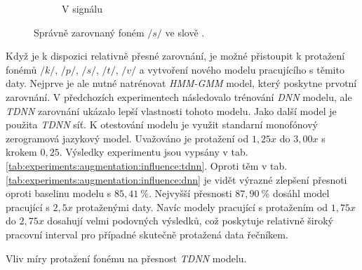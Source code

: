 \begin{figure}[htpb]
\begin{subfigure}[b]{0.55\textwidth}
    \caption{V signálu}
    \label{fig:experiments:augmentation:alignemnt:correct:audio}
  \end{subfigure}
  \caption{Správně zarovnaný foném $/s/$ ve slově .}
  \label{fig:experiments:augmentation:alignemnt:correct}
\end{figure}

Když je k dispozici relativně přesné zarovnání, je možné přistoupit k protažení fonémů $/k/$, $/p/$, $/s/$, $/t/$, $/v/$ a vytvoření nového modelu pracujícího s těmito daty. Nejprve je ale nutné natrénovat \textit{HMM-GMM} model, který poskytne prvotní zarovnání. V předchozích experimentech následovalo trénování \textit{DNN} modelu, ale \textit{TDNN} zarovnání ukázalo lepší vlastnosti tohoto modelu. Jako další model je použita \textit{TDNN} síť. K otestování modelu je využit standarní monofónový zerogramová jazykový model. Uvažováno je protažení od $1,25x$ do $3,00x$ s krokem $0,25$. Výsledky experimentu jsou vypsány v tab. \ref{tab:experiments:augmentation:influence:tdnn}. Oproti těm v tab. \ref{tab:experiments:augmentation:influence:dnn} je vidět výrazné zlepšení přesnoti  oproti baselinu modelu s $85,41\ \%$. Nejvyšší přesnosti $87,90\ \%$ dosáhl model pracující s $2,5x$ protaženými daty. Navíc modely pracující s protažením od $1,75x$ do $2,75x$ dosahují velmi podovných výsledků, což poskytuje relativně široký pracovní interval pro případné skutečně protažená data řečníkem.

\begin{table}[htpb]
  \centering
  \def\arraystretch{1.5}
  \caption{Vliv míry protažení fonému na přesnost \textit{TDNN} modelu.}
  \label{tab:experiments:augmentation:influence:tdnn}
\end{table}

